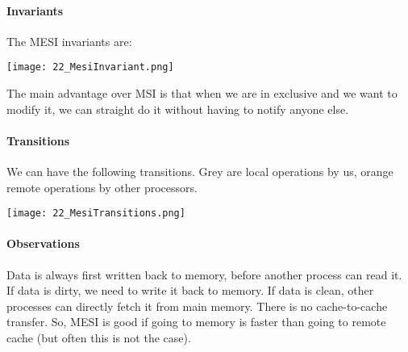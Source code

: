 \paragraph{Invariants}
The MESI invariants are:

\texttt{[image: 22\_MesiInvariant.png]}

The main advantage over MSI is that when we are in exclusive and we want to modify it, we can straight do it without having to notify anyone else.

\paragraph{Transitions}
We can have the following transitions. Grey are local operations by us, orange remote operations by other processors.

\texttt{[image: 22\_MesiTransitions.png]}

\paragraph{Observations}
Data is always first written back to memory, before another process can read it. If data is dirty, we need to write it back to memory. If data is clean, other processes can directly fetch it from main memory. There is no cache-to-cache transfer. So, MESI is good if going to memory is faster than going to remote cache (but often this is not the case).
